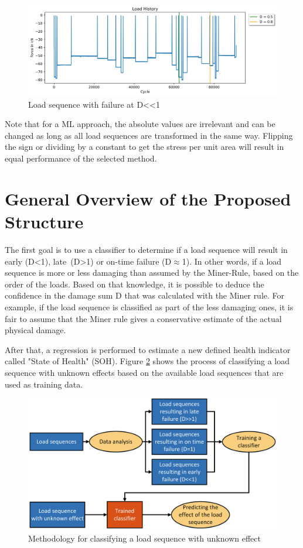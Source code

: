 \begin{figure}[H]
	\centering
	\includegraphics[width=1\linewidth]{IMGs/Load/L2.jpg}
	\caption{Load sequence with failure at D<<1}
	\label{fig:L3}
\end{figure}

Note that for a ML approach, the absolute values are irrelevant and can be changed as long as all load sequences are transformed in the same way. Flipping the sign or dividing by a constant to get the stress per unit area will result in equal performance of the selected method.

\section{General Overview of the Proposed Structure}\label{GO}
The first goal is to use a classifier to determine if a load sequence will result in early (D<1), late~(D>1) or on-time failure (D$\approx$1). In other words, if a load sequence is more or less damaging than assumed by the Miner-Rule, based on the order of the loads. Based on that knowledge, it is possible to deduce the confidence in the damage sum D that was calculated with the Miner rule. For example, if the load sequence is classified as part of the less damaging ones, it is fair to assume that the Miner rule gives a conservative estimate of the actual physical damage. 

After that, a regression is performed to estimate a new defined health indicator called "State of Health" (SOH). 
Figure \ref{fig:GeneralMethod1} shows the process of classifying a load sequence with unknown effects based on the available load sequences that are used as training data. 

\begin{figure}[H]
	\centering
	\includegraphics[width=0.95\linewidth]{IMGs/Method1.png}
	\caption{Methodology for classifying a load sequence with unknown effect}
	\label{fig:GeneralMethod1}
\end{figure}

